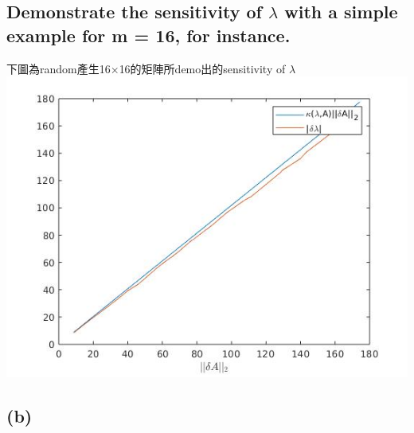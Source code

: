 \documentclass[12pt]{article}
\begin{document}
\subsection*{Demonstrate the sensitivity of $\lambda$ with a simple example for m = 16, for instance.}
下圖為random產生16$\times$16的矩陣所demo出的sensitivity of $\lambda$\\
\includegraphics[scale = 0.75]{random_demo.jpg}

\subsection*{(b)}
\end{document}
